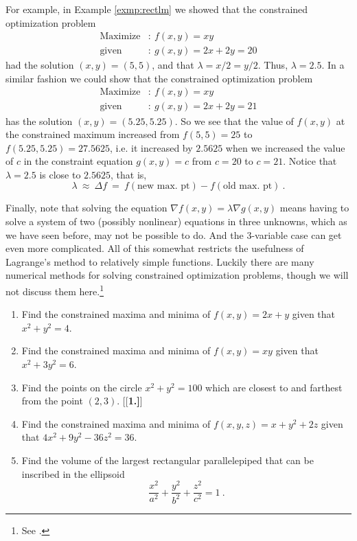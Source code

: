 For example, in Example \ref{exmp:rectlm} we showed that the constrained optimization problem
\begin{align*}
  \text{Maximize}&: ~ f(x,y) = xy\\
  \text{given}&: ~ g(x,y) = 2x + 2y = 20
\end{align*}
had the solution $(x,y) = (5,5)$, and that $\lambda = x/2 = y/2$. Thus, $\lambda = 2.5$. In a similar fashion we could
show that the constrained optimization problem
\begin{align*}
  \text{Maximize}&: ~ f(x,y) = xy\\
  \text{given}&: ~ g(x,y) = 2x + 2y = 21
\end{align*}
has the solution $(x,y) = (5.25,5.25)$. So we see that the value of $f(x,y)$ at the constrained maximum increased from
$f(5,5)=25$ to $f(5.25,5.25)=27.5625$, i.e. it increased by $2.5625$ when we increased the value of $c$ in the constraint
equation $g(x,y)=c$ from $c=20$ to $c=21$. Notice that $\lambda = 2.5$ is close to $2.5625$, that is,
\begin{displaymath}
 \lambda ~\approx~ \Delta f ~=~ f(\text{new max. pt}) - f(\text{old max. pt}) ~.
\end{displaymath}


Finally, note that
solving the equation $\nabla f(x,y) = \lambda \nabla g(x,y)$ means having to solve a system of two (possibly
nonlinear) equations in three unknowns, which as we have seen before, may not be possible to do. And the
3-variable case can get even more complicated. All of this somewhat
restricts the usefulness of Lagrange's method to relatively simple functions. Luckily there are many numerical methods
for solving constrained optimization problems, though we will not discuss them here.\footnote{See \cite{bss}.}

\startexercises\label{sec2dot7}
\begin{enumerate}[\bfseries 1.]
 \item Find the constrained maxima and minima of $f(x,y) = 2x+y$ given that $x^2 + y^2 =4$.
 \item Find the constrained maxima and minima of $f(x,y) = xy$ given that $x^2 + 3y^2 =6$.
 \item Find the points on the circle $x^2 + y^2 = 100$ which are closest to and farthest from the point $(2,3)$.
[{[\bfseries 1.]}]
 \item Find the constrained maxima and minima of $f(x,y,z) = x+y^2 +2z$ given that $4x^2 + 9y^2 -36z^2 =36$.
 \item Find the volume of the largest rectangular parallelepiped that can be inscribed in the ellipsoid
  \begin{displaymath}
   \frac{x^2}{a^2} + \frac{y^2}{b^2} + \frac{z^2}{c^2} = 1 ~.
  \end{displaymath}
\end{enumerate}
